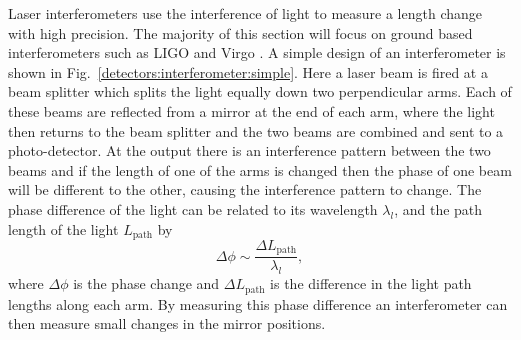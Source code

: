 Laser interferometers use the interference of light to measure a
length change with high precision.  The majority of this
section will focus on ground based interferometers such as \gls{LIGO} and Virgo
\citep{aasi2015AdvancedLIGO,acernese2015AdvancedVirgo}.  A simple design of an
interferometer is shown in
Fig.~\ref{detectors:interferometer:simple}. Here a laser
beam is fired at a beam splitter which splits the light equally down two
perpendicular arms.  Each of these beams are reflected from a mirror at the end
of each arm, where the light then returns to the beam splitter and the two beams
are combined and sent to a photo-detector.  At the output there is an
interference pattern between the two beams and if the length of one of the arms
is changed then the phase of one beam will be different to the other, causing the interference pattern to change.  The phase difference of the light can be
related to its wavelength $\lambda_l$, and the path length of the light $L_{\text{path}}$ by
%
\begin{equation}
\label{intro:detectors:phasechange}
\Delta \phi \sim \frac{\Delta L_{\text{path}}}{\lambda_l},
\end{equation}
%
where $\Delta \phi$ is the phase change and $\Delta L_{\text{path}}$ is the difference in the
light path lengths along each arm.  By measuring this phase difference an interferometer can then
measure small changes in the mirror positions.

